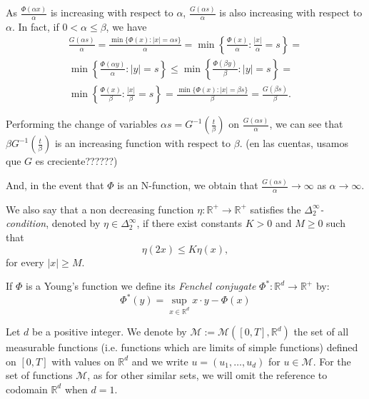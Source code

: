 \documentclass[twoside]{article}
\theoremstyle{remark}
\newcommand{\rr}{\mathbb{R}}
\renewcommand{\leq}{\leqslant}
\renewcommand{\geq}{\geqslant}
\begin{document}
As $\frac{\Phi(\alpha x)}{\alpha}$ is increasing with respect to $\alpha$, 
$\frac{G(\alpha s)}{\alpha}$ is also increasing 
with respect to $\alpha$.
In fact, 
if $0<\alpha \leq \beta$, we have
\[
\begin{split}
 \frac{G(\alpha s)}{\alpha}=
\frac{\min\{\Phi(x):|x|=\alpha s\}}{\alpha}=
\min 
\left\{\frac{\Phi(x)}{\alpha}:\frac{|x|}{\alpha}=s \right\}=
\\
\min\left\{\frac{\Phi(\alpha y)}{\alpha}:|y|=s \right\}
\leq \min \left\{\frac{\Phi(\beta y)}{\beta}: |y|=s \right\}=
\\
\min \left\{ \frac{\Phi(x)}{\beta}: \frac{|x|}{\beta}=s\right\}=
\frac{\min\{\Phi(x): |x|=\beta s\}}{\beta}=
\frac{G(\beta s)}{\beta}.
\end{split}
\]



Performing the change of variables $\alpha s=G^{-1}(\frac{t}{\beta})$ on $\frac{G(\alpha s)}{\alpha}$, 
we can see that $\beta G^{-1}(\frac{t}{\beta})$ is an increasing function with respect to 
$\beta$. {\color{red}(en las cuentas, usamos que $G$ es creciente??????)}

And, in the event that $\Phi$ is an N-function, we obtain that $\frac{G(\alpha s)}{\alpha}\to \infty$
as $\alpha \to \infty$.







We also say that a non decreasing function $\eta:\mathbb{R}^+\rightarrow \mathbb{R}^+$ satisfies the  \emph{$\Delta_2^{\infty}$-condition}, denoted by $\eta \in \Delta_2^{\infty}$,
if there exist  constants $K>0$ and  $M\geq 0$ such that
\begin{equation}\label{delta2defi}\eta(2x)\leq K\eta(x),
\end{equation}
for every $|x|\geq M$.

If $\Phi$ is a Young's function we define its \emph{Fenchel conjugate}   $\Phi^*:\mathbb{R}^d\to \mathbb{R}^+ $ by:
\begin{equation}\label{eq:conjugada}
 \Phi^*(y)=\sup\limits_{x\in\mathbb{R}^d} x\cdot y-\Phi(x)
\end{equation}


Let $d$ be a positive integer. We denote by $\mathcal{M}:=\mathcal{M}([0,T],\rr^d)$  the set of all measurable functions (i.e. functions which are limits of simple functions)  defined on $[0,T]$ with values on $\mathbb{R}^d$ and  we write $u=(u_1,\dots,u_d)$ for  $u\in \mathcal{M}$. For the set of functions $\mathcal{M}$, as for other similar sets, we will omit the reference to codomain $\mathbb{R}^d$ when $d=1$.
\end{document}
